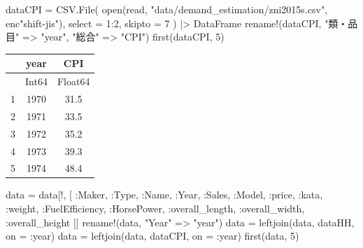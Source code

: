 \documentclass[
  letterpaper,
  DIV=11,
  numbers=noendperiod]{scrreprt}
\newenvironment{Shaded}{\begin{snugshade}}{\end{snugshade}}
\newcommand{\DataTypeTok}[1]{\textcolor[rgb]{0.68,0.00,0.00}{#1}}
\newcommand{\FloatTok}[1]{\textcolor[rgb]{0.68,0.00,0.00}{#1}}
\newcommand{\FunctionTok}[1]{\textcolor[rgb]{0.28,0.35,0.67}{#1}}
\newcommand{\NormalTok}[1]{\textcolor[rgb]{0.00,0.23,0.31}{#1}}
\newcommand{\OperatorTok}[1]{\textcolor[rgb]{0.37,0.37,0.37}{#1}}
\newcommand{\StringTok}[1]{\textcolor[rgb]{0.13,0.47,0.30}{#1}}
\begin{document}
\begin{Shaded}
\begin{Highlighting}[]
\NormalTok{dataCPI }\OperatorTok{=}\NormalTok{ CSV.}\FunctionTok{File}\NormalTok{(}
    \FunctionTok{open}\NormalTok{(read, }\StringTok{"data/demand\_estimation/zni2015s.csv"}\NormalTok{, enc}\StringTok{"shift{-}jis"}\NormalTok{), }
\NormalTok{    select }\OperatorTok{=} \FloatTok{1}\OperatorTok{:}\FloatTok{2}\NormalTok{,}
\NormalTok{    skipto }\OperatorTok{=} \FloatTok{7}
\NormalTok{    ) }\OperatorTok{|\textgreater{}}\NormalTok{ DataFrame}
\FunctionTok{rename!}\NormalTok{(dataCPI, }\StringTok{"類・品目"} \OperatorTok{=\textgreater{}} \StringTok{"year"}\NormalTok{, }\StringTok{"総合"} \OperatorTok{=\textgreater{}} \StringTok{"CPI"}\NormalTok{)}
\FunctionTok{first}\NormalTok{(dataCPI, }\FloatTok{5}\NormalTok{)}
\end{Highlighting}
\end{Shaded}

\begin{tabular}{r|cc}
    & year & CPI\\
    \hline
    & Int64 & Float64\\
    \hline
    1 & 1970 & 31.5 \\
    2 & 1971 & 33.5 \\
    3 & 1972 & 35.2 \\
    4 & 1973 & 39.3 \\
    5 & 1974 & 48.4 \\
\end{tabular}

\begin{Shaded}
\begin{Highlighting}[]
\NormalTok{data }\OperatorTok{=}\NormalTok{ data[!, [}
        \OperatorTok{:}\NormalTok{Maker, }\OperatorTok{:}\DataTypeTok{Type}\NormalTok{, }\OperatorTok{:}\NormalTok{Name, }\OperatorTok{:}\NormalTok{Year, }\OperatorTok{:}\NormalTok{Sales, }
        \OperatorTok{:}\NormalTok{Model, }\OperatorTok{:}\NormalTok{price, }\OperatorTok{:}\NormalTok{kata, }\OperatorTok{:}\NormalTok{weight, }\OperatorTok{:}\NormalTok{FuelEfficiency, }
        \OperatorTok{:}\NormalTok{HorsePower, }\OperatorTok{:}\NormalTok{overall\_length, }\OperatorTok{:}\NormalTok{overall\_width, }\OperatorTok{:}\NormalTok{overall\_height}
\NormalTok{        ]]}
\FunctionTok{rename!}\NormalTok{(data, }\StringTok{"Year"} \OperatorTok{=\textgreater{}} \StringTok{"year"}\NormalTok{)}
\NormalTok{data }\OperatorTok{=} \FunctionTok{leftjoin}\NormalTok{(data, dataHH, on }\OperatorTok{=} \OperatorTok{:}\NormalTok{year)}
\NormalTok{data }\OperatorTok{=} \FunctionTok{leftjoin}\NormalTok{(data, dataCPI, on }\OperatorTok{=} \OperatorTok{:}\NormalTok{year)}
\FunctionTok{first}\NormalTok{(data, }\FloatTok{5}\NormalTok{)}
\end{Highlighting}
\end{Shaded}
\end{document}

